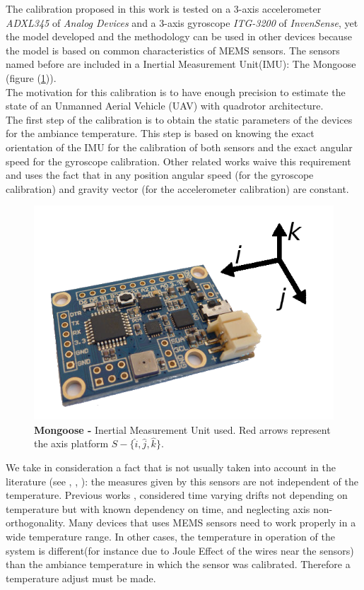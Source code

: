 \documentclass[conference]{IEEEtran}
\newcommand{\refp}[1]{(\ref{#1})}
\begin{document}
The calibration proposed in this work is tested on a 3-axis accelerometer \emph{ADXL345} of \emph{Analog Devices} and a 3-axis gyroscope \emph{ITG-3200} of \emph{InvenSense}, yet the model developed and the methodology can be used in other devices because the model is based on common characteristics of MEMS sensors. The sensors named before are included in a Inertial Measurement Unit(IMU): The Mongoose (figure \refp{fig:mongoose}). \\

The motivation for this calibration is to have enough precision to estimate the state of an Unmanned Aerial Vehicle (UAV) with quadrotor architecture.\\

The first step of the calibration is to obtain the static parameters of the devices for the ambiance temperature. This step is based on knowing the exact orientation of the IMU for the calibration of both sensors and the exact angular speed for the gyroscope calibration. Other related works waive this requirement\cite{bib:calib_imu, bib:kalman} and uses the fact that in any position angular speed (for the gyroscope calibration) and gravity vector (for the accelerometer calibration) are constant.\\

\begin{figure}[h]
	\centering
	\includegraphics[width=.6\columnwidth]{./pics_paper/mongoose.png}
	\caption{\textbf{Mongoose -} Inertial Measurement Unit used. Red arrows represent the axis platform $S - \{\hat{i}, \hat{j}, \hat{k} \}$. }
	\label{fig:mongoose}
\end{figure}

We take in consideration a fact that is not usually taken into account in the literature (see \cite{bib:calib_imu}, \cite{bib:kalman}, \cite{bib:calib_imu_dos}): the measures given by this sensors are not independent of the temperature. Previous works \cite{bib:ultimo_tio}, considered time varying drifts not depending on temperature but with known dependency on time, and neglecting axis non-orthogonality. Many devices that uses MEMS sensors need to work properly in a wide temperature range. In other cases, the temperature in operation of the system is different(for instance due to Joule Effect of the wires near the sensors) than the ambiance temperature in which the sensor was calibrated. Therefore a temperature adjust must be made.
   
\end{document}
